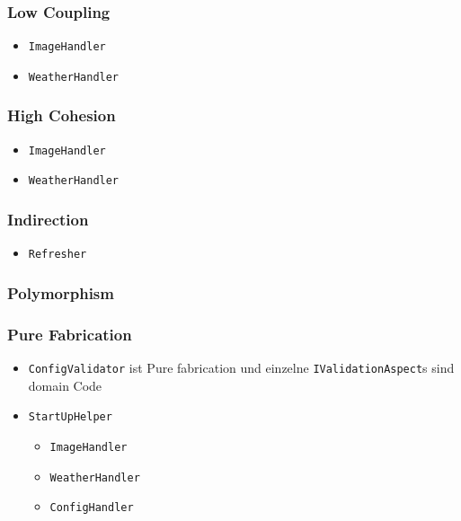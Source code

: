\subsubsection{Low Coupling}
\begin{itemize}
	\item \texttt{ImageHandler}		
	\item \texttt{WeatherHandler}	%
\end{itemize}

\subsubsection{High Cohesion}
\begin{itemize}
	\item \texttt{ImageHandler}		%
	\item \texttt{WeatherHandler}	%
\end{itemize}

\subsubsection{Indirection}
\begin{itemize}
	\item \texttt{Refresher}		%
\end{itemize}

\subsubsection{Polymorphism}

\subsubsection{Pure Fabrication}
\begin{itemize}
	\item \texttt{ConfigValidator} ist Pure fabrication und einzelne \texttt{IValidationAspect}s sind domain Code 
	\item \texttt{StartUpHelper} 		%
	\begin{itemize}
		\item \texttt{ImageHandler}
		\item \texttt{WeatherHandler} 	%
		\item \texttt{ConfigHandler} 	%
	\end{itemize}
\end{itemize}

